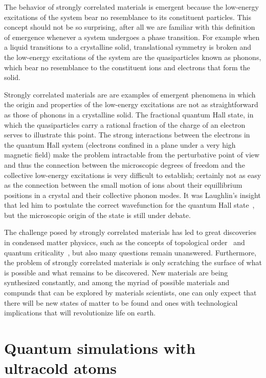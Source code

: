 \documentclass[oneside,11pt]{memoir}
\begin{document}
The behavior of strongly correlated materials is emergent because the
low-energy excitations of the system bear no resemblance to its constituent
particles.  This concept should not be so surprising, after all we are familiar
with this definition of emergence whenever a system undergoes a phase
transition.  For example when a liquid transitions to a crystalline solid,
translational symmetry is broken  and the low-energy excitations of the system
are the quasiparticles known as phonons, which bear no resemblance to the
constituent ions and electrons that form the solid.   

Strongly correlated materials are are examples of emergent phenomena in which
the origin and properties of the low-energy excitations are not as
straightforward as those of phonons in a crystalline solid.  The fractional
quantum Hall state, in which the quasiparticles carry a rational fraction of
the charge of an electron serves to illustrate this point.  The strong
interactions between the electrons in the quantum Hall system (electrons
confined in a plane under a very high magnetic field) make the problem
intractable from the perturbative point of view and thus the connection between
the microscopic degrees of freedom and the collective low-energy excitations is
very difficult to establish; certainly not as easy as the connection between
the small motion of ions about their equillibrium positions in a crystal and
their collective phonon modes. It was Laughlin's insight that led him to
postulate the correct wavefunction  for the quantum Hall
state~\cite{PhysRevLett.50.1395}, but the microscopic origin of the state is
still under debate.   

The challenge posed by strongly correlated materials has led to great
discoveries in condensed matter physiccs, such as the concepts of topological
order~\cite{wen1990topological} and quantum
criticality~\cite{PhysRevB.14.1165,sachdev2011quantum}, but also many questions
remain unanswered.  Furthermore, the problem of strongly correlated materials
is only scratching the surface of what is possible and what remains to be
discovered.  New materials are being synthesized constantly, and among the
myriad of possible materials and compunds that can be explored by materials
scientists, one can only expect that there will be new states of matter to be
found and ones with technological implications that will revolutionize life on
earth.  


\section{Quantum simulations with ultracold atoms}
\end{document}
